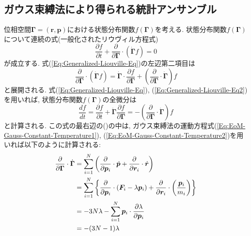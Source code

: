 \subsection{ガウス束縛法により得られる統計アンサンブル}
位相空間$\bm{\Gamma} = (\bm{r}, \bm{p})$における状態分布関数$f(\bm{\Gamma})$を考える.
状態分布関数$f(\bm{\Gamma})$について連続の式(一般化されたリウヴィル方程式)
\begin{equation}
    \frac{\partial f}{\partial t}
    +
    \frac{\partial}{\partial \bm{\Gamma}}
    \cdot
    \left(
        \dot{\bm{\Gamma}} f
    \right)
    =
    0
    \label{Eq:Generalized-Liouville-Eq}
\end{equation}
が成立する.
式(\ref{Eq:Generalized-Liouville-Eq})の左辺第二項目は
\begin{equation}
    \frac{\partial}{\partial \bm{\Gamma}}
    \cdot
    \left(
        \dot{\bm{\Gamma}} f
    \right)
    =
    \dot{\bm{\Gamma}}
    \cdot
    \frac{\partial f}{\partial \bm{\Gamma}}
    +
    \left(
        \frac{\partial}{\partial \bm{\Gamma}}
        \cdot
        \dot{\bm{\Gamma}}
    \right)
    f
    \label{Eq:Generalized-Liouville-Eq2}
\end{equation}
と展開される.
式(\ref{Eq:Generalized-Liouville-Eq}), (\ref{Eq:Generalized-Liouville-Eq2})を用いれば, 状態分布関数$f(\bm{\Gamma})$の全微分は
\begin{equation}
    \frac{df}{dt}
    =
    \frac{\partial f}{\partial t}
    +
    \dot{\bm{\Gamma}}
    \frac{\partial f}{\partial \bm{\Gamma}}
    =
    -
    \left(
        \frac{\partial}{\partial \bm{\Gamma}}
        \cdot
        \dot{\bm{\Gamma}}
    \right)
    f
    \label{Eq:Gauss-dfdt}
\end{equation}
と計算される. この式の最右辺の()の中は, ガウス束縛法の運動方程式(\ref{Eq:EoM-Gauss-Constant-Temperature1}), (\ref{Eq:EoM-Gauss-Constant-Temperature2})を用いれば以下のように計算される:
\begin{align}
    \frac{\partial}{\partial \bm{\Gamma}}
    \cdot
    \dot{\bm{\Gamma}}
    &=
    \sum_{i=1}^{N}
    \left(
        \frac{\partial}{\partial \bm{p}_{i}} \cdot \dot{\bm{p}}
        +
        \frac{\partial}{\partial \bm{r}_{i}} \cdot \dot{\bm{r}}
    \right)
    \notag \\
    &=
    \sum_{i=1}^{N}
    \left\{
        \frac{\partial}{\partial \bm{p}_{i}} \cdot
        \left(\bm{F}_{i} - \lambda \bm{p}_{i }\right)
        +
        \frac{\partial}{\partial \bm{r}_{i}} \cdot
        \left(\frac{\bm{p}_{i}}{m_{i}}\right)
    \right\}
    \notag \\
    &=
    -3N\lambda
    -
    \sum_{i=1}^{N}
    \bm{p}_{i} \cdot \frac{\partial \lambda}{\partial \bm{p}_{i}}
    \notag \\
    &=
    - (3N - 1) \lambda
    \label{Eq:Gauss-dfdt2}
\end{align}
